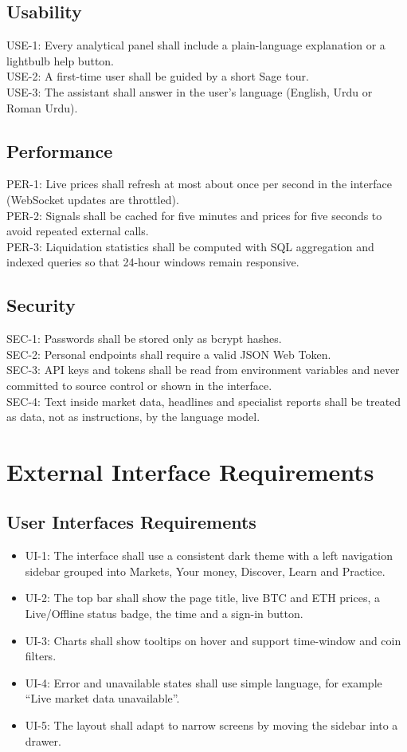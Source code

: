 \subsection{Usability}
USE-1: Every analytical panel shall include a plain-language explanation or a lightbulb help button.\\
USE-2: A first-time user shall be guided by a short Sage tour.\\
USE-3: The assistant shall answer in the user's language (English, Urdu or Roman Urdu).

\subsection{Performance}
PER-1: Live prices shall refresh at most about once per second in the interface (WebSocket updates are throttled).\\
PER-2: Signals shall be cached for five minutes and prices for five seconds to avoid repeated external calls.\\
PER-3: Liquidation statistics shall be computed with SQL aggregation and indexed queries so that 24-hour windows remain responsive.

\subsection{Security}
SEC-1: Passwords shall be stored only as bcrypt hashes.\\
SEC-2: Personal endpoints shall require a valid JSON Web Token.\\
SEC-3: API keys and tokens shall be read from environment variables and never committed to source control or shown in the interface.\\
SEC-4: Text inside market data, headlines and specialist reports shall be treated as data, not as instructions, by the language model.

\section{External Interface Requirements}
\subsection{User Interfaces Requirements}
\begin{itemize}
\item UI-1: The interface shall use a consistent dark theme with a left navigation sidebar grouped into Markets, Your money, Discover, Learn and Practice.
\item UI-2: The top bar shall show the page title, live BTC and ETH prices, a Live/Offline status badge, the time and a sign-in button.
\item UI-3: Charts shall show tooltips on hover and support time-window and coin filters.
\item UI-4: Error and unavailable states shall use simple language, for example ``Live market data unavailable''.
\item UI-5: The layout shall adapt to narrow screens by moving the sidebar into a drawer.
\end{itemize}

